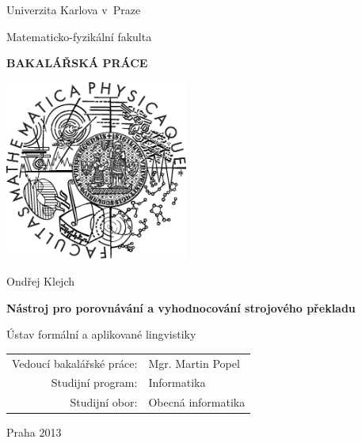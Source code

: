 \documentclass[12pt,a4paper]{report}
\begin{document}


\pagestyle{empty}
\begin{center}

\large

Univerzita Karlova v~Praze

\medskip

Matematicko-fyzikální fakulta

\vfill

{\bf\Large BAKALÁŘSKÁ PRÁCE}

\vfill

\centerline{\mbox{\includegraphics[width=60mm]{img/logo.eps}}}

\vfill
\vspace{5mm}

{\LARGE Ondřej Klejch}

\vspace{15mm}

{\LARGE\bfseries Nástroj pro porovnávání a vyhodnocování strojového překladu}

\vfill

Ústav formální a aplikované lingvistiky

\vfill

\begin{tabular}{rl}

Vedoucí bakalářské práce: & Mgr. Martin Popel \\
\noalign{\vspace{2mm}}
Studijní program: & Informatika  \\
\noalign{\vspace{2mm}}
Studijní obor: & Obecná informatika \\
\end{tabular}

\vfill

Praha 2013

\end{center}
\end{document}
